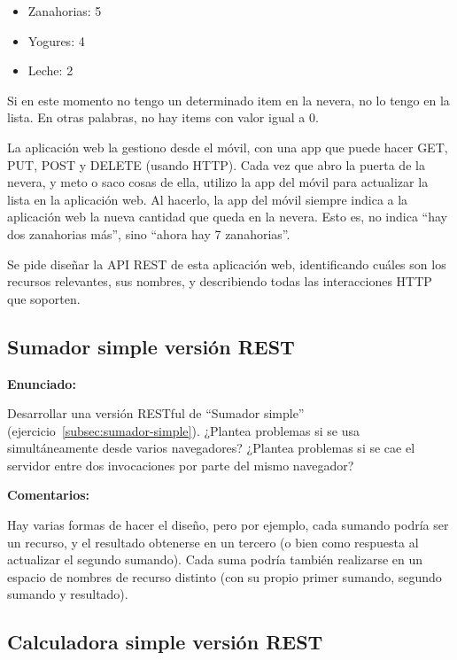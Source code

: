 \begin{itemize}
\item Zanahorias: 5
\item Yogures: 4
\item Leche: 2
\end{itemize}

Si en este momento no tengo un determinado item en la nevera, no lo tengo en la lista. En otras palabras, no hay items con valor igual a 0.

La aplicación web la gestiono desde el móvil, con una app que puede hacer GET, PUT, POST y DELETE (usando HTTP). Cada vez que abro la puerta de la nevera, y meto o saco cosas de ella, utilizo la app del móvil para actualizar la lista en la aplicación web. Al hacerlo, la app del móvil siempre indica a la aplicación web la nueva cantidad que queda en la nevera. Esto es, no indica ``hay dos zanahorias más'', sino ``ahora hay 7 zanahorias''.

Se pide diseñar la API REST de esta aplicación web, identificando cuáles son los recursos relevantes, sus nombres, y describiendo todas las interacciones HTTP que soporten.

\subsection{Sumador simple versión REST}
\label{subsec:sumador-simple-rest}

\textbf{Enunciado:}

Desarrollar una versión RESTful de ``Sumador simple'' (ejercicio~\ref{subsec:sumador-simple}). ¿Plantea problemas si se usa simultáneamente desde varios navegadores? ¿Plantea problemas si se cae el servidor entre dos invocaciones por parte del mismo navegador?

\textbf{Comentarios:}

Hay varias formas de hacer el diseño, pero por ejemplo, cada sumando podría ser un recurso, y el resultado obtenerse en un tercero (o bien como respuesta al actualizar el segundo sumando). Cada suma podría también realizarse en un espacio de nombres de recurso distinto (con su propio primer sumando, segundo sumando y resultado).


\subsection{Calculadora simple versión REST}
\label{subsec:calc-simple-rest}


